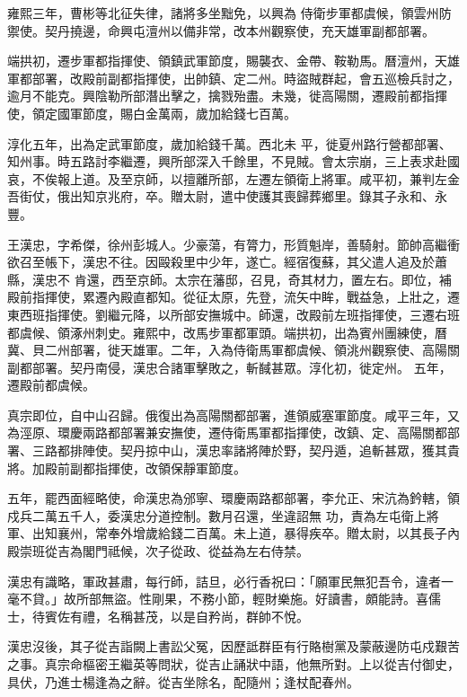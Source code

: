 \begin{pinyinscope}
 雍熙三年，曹彬等北征失律，諸將多坐黜免，以興為
 侍衛步軍都虞候，領雲州防禦使。契丹撓邊，命興屯澶州以備非常，改本州觀察使，充天雄軍副都部署。



 端拱初，遷步軍都指揮使、領鎮武軍節度，賜襲衣、金帶、鞍勒馬。曆澶州，天雄軍都部署，改殿前副都指揮使，出帥鎮、定二州。時盜賊群起，會五巡檢兵討之，逾月不能克。興陰勒所部潛出擊之，擒戮殆盡。未幾，徙高陽關，遷殿前都指揮使，領定國軍節度，賜白金萬兩，歲加給錢七百萬。



 淳化五年，出為定武軍節度，歲加給錢千萬。西北未
 平，徙夏州路行營都部署、知州事。時五路討李繼遷，興所部深入千餘里，不見賊。會太宗崩，三上表求赴國哀，不俟報上道。及至京師，以擅離所部，左遷左領衛上將軍。咸平初，兼判左金吾街仗，俄出知京兆府，卒。贈太尉，遣中使護其喪歸葬鄉里。錄其子永和、永豐。



 王漢忠，字希傑，徐州彭城人。少豪蕩，有膂力，形質魁岸，善騎射。節帥高繼衝欲召至帳下，漢忠不往。因毆殺里中少年，遂亡。經宿復蘇，其父遣人追及於蕭縣，漢忠不
 肯還，西至京師。太宗在藩邸，召見，奇其材力，置左右。即位，補殿前指揮使，累遷內殿直都知。從征太原，先登，流矢中眸，戰益急，上壯之，遷東西班指揮使。劉繼元降，以所部安撫城中。師還，改殿前左班指揮使，三遷右班都虞候、領涿州刺史。雍熙中，改馬步軍都軍頭。端拱初，出為賓州團練使，曆冀、貝二州部署，徙天雄軍。二年，入為侍衛馬軍都虞候、領洮州觀察使、高陽關副都部署。契丹南侵，漢忠合諸軍擊敗之，斬馘甚眾。淳化初，徙定州。
 五年，遷殿前都虞候。



 真宗即位，自中山召歸。俄復出為高陽關都部署，進領威塞軍節度。咸平三年，又為涇原、環慶兩路都部署兼安撫使，遷侍衛馬軍都指揮使，改鎮、定、高陽關都部署、三路都排陣使。契丹掠中山，漢忠率諸將陣於野，契丹遁，追斬甚眾，獲其貴將。加殿前副都指揮使，改領保靜軍節度。



 五年，罷西面經略使，命漢忠為邠寧、環慶兩路都部署，李允正、宋沆為鈐轄，領戍兵二萬五千人，委漢忠分道控制。數月召還，坐違詔無
 功，責為左屯衛上將軍、出知襄州，常奉外增歲給錢二百萬。未上道，暴得疾卒。贈太尉，以其長子內殿崇班從吉為閣門祗候，次子從政、從益為左右侍禁。



 漢忠有識略，軍政甚肅，每行師，詰旦，必行香祝曰：「願軍民無犯吾令，違者一毫不貸。」故所部無盜。性剛果，不務小節，輕財樂施。好讀書，頗能詩。喜儒士，待賓佐有禮，名稱甚茂，以是自矜尚，群帥不悅。



 漢忠沒後，其子從吉詣闕上書訟父冤，因歷詆群臣有行賂樹黨及蒙蔽邊防屯戍艱苦
 之事。真宗命樞密王繼英等問狀，從吉止誦狀中語，他無所對。上以從吉付御史，具伏，乃進士楊逢為之辭。從吉坐除名，配隨州；逢杖配春州。




\end{pinyinscope}

